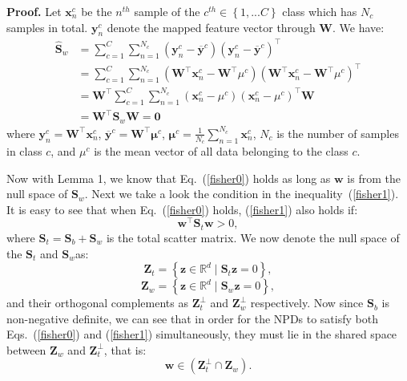 \documentclass[10pt,twocolumn,letterpaper]{article}
\begin{document}
\textbf {Proof.} Let $\mathbf{x}_{n}^{c}$ be the $n^{th}$ sample of the $c^{th} \in \left \{1,...C\right \}$ class which has $N_c$ samples in total. $\mathbf{y}_{n}^{c}$ denote the mapped feature vector through $\mathbf{W}$. We have:
\vspace{-0.2cm}
\begin{align*}
\widehat{\mathbf{S}}_{w} &= \sum^{C}_{c=1} \sum^{N_{c}}_{n=1}(\mathbf{y}_{n}^{c} - \mathbf{\overline{y}}^{c})(\mathbf{y}_{n}^{c} - \mathbf{\overline{y}}^{c})^{\top} \\
&=\sum^{C}_{c=1} \sum^{N_{c}}_{n=1}(\mathbf{W}^{\top}\mathbf{x}_{n}^{c} - \mathbf{W}^{\top}\mu^{c})(\mathbf{W}^{\top}\mathbf{x}_{n}^{c} - \mathbf{W}^{\top}\mu^{c})^{\top}\\
&= \mathbf{W}^{\top}\sum^{C}_{c=1} \sum^{N_{c}}_{n=1}(\mathbf{x}_{n}^{c} - \mu^{c})(\mathbf{x}_{n}^{c} - \mu^{c})^{\top}\mathbf{W}\\
&=\mathbf{W}^{\top}\mathbf{S}_{w}\mathbf{W} = \mathbf{0}
\end{align*}
where $\mathbf{y}_{n}^{c} = \mathbf{W}^{\top}\mathbf{x}_{n}^{c}$, $\mathbf{\overline{y}}^{c} = \mathbf{W}^{\top}\mathbf{\mu}^{c}$, $\mathbf{\mu}^{c} = \frac{1}{N_{c}} \sum^{N_{c}}_{n=1}\mathbf{x}^{c}_{n}$, $N_{c}$ is the number of samples in class $c$, and $\mu^{c}$ is the mean vector of all data belonging to the class $c$.

Now with Lemma 1, we know that  Eq.~(\ref{fisher0}) holds as long as $\mathbf{w}$ is from the null space of $\mathbf{S}_{w}$. Next we take a look the condition in the  inequality~(\ref{fisher1}). It is easy to see that when Eq.~(\ref{fisher0}) holds, (\ref{fisher1}) also holds if:
\begin{equation} 
\mathbf{w}^{\top}\mathbf{S}_{t} \mathbf{w} > 0,
\end{equation}
where $\mathbf{S}_{t} = \mathbf{S}_{b} + \mathbf{S}_{w}$ is the total scatter matrix. We now denote the null space of the $\mathbf{S}_{t}$ and $\mathbf{S}_{w}$as:
\begin{equation} 
\mathbf{Z}_{t} =  \left \{  \mathbf{z}\in \mathbb{R}^{d}\mid \mathbf{S}_{t}\mathbf{z}=0\right \},
\end{equation}
\begin{equation} 
\mathbf{Z}_{w} =  \left \{  \mathbf{z}\in \mathbb{R}^d\mid \mathbf{S}_{w}\mathbf{z}=0\right \},
\end{equation}
and their orthogonal complements as $\mathbf{Z}_{t}^{\perp}$ and $\mathbf{Z}_{w}^{\perp}$ respectively. 
Now since $\mathbf{S}_{b}$ is non-negative definite, we can see that in order for the NPDs to satisfy both Eqs.~(\ref{fisher0}) and (\ref{fisher1}) simultaneously, they must  lie in the shared space between $ \mathbf{Z}_{w}$ and $\mathbf{Z}_{t}^{\perp}$, that is: 
\begin{equation} 
\mathbf{w} \in (\mathbf{Z}_{t}^{\perp}\cap  \mathbf{Z}_{w}).
\end{equation}
\end{document}
